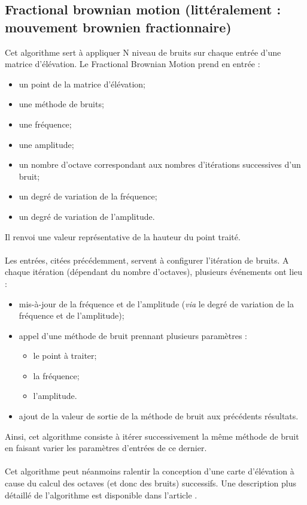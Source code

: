 \subsection{Fractional brownian motion (littéralement : mouvement brownien fractionnaire)}
Cet algorithme sert à appliquer N niveau de bruits sur chaque entrée d'une matrice d'élévation.
Le Fractional Brownian Motion prend en entrée :
\begin{itemize}
 \item un point de la matrice d'élévation;
 \item une méthode de bruits;
 \item une fréquence;
 \item une amplitude;
 \item un nombre d'octave correspondant aux nombres d'itérations successives d'un bruit;
 \item un degré de variation de la fréquence;
 \item un degré de variation de l'amplitude.
\end{itemize}
Il renvoi une valeur représentative de la hauteur du point traité.
\paragraph{}
Les entrées, citées précédemment, servent à configurer l'itération de bruits.
A chaque itération (dépendant du nombre d'octaves), plusieurs événements ont lieu :
\begin{itemize}
 \item mis-à-jour de la fréquence et de l'amplitude (\textit{via} le degré de variation de la fréquence et de l'amplitude);
 \item appel d'une méthode de bruit prennant plusieurs paramètres :
 \begin{itemize}
  \item le point à traiter;
  \item la fréquence;
  \item l'amplitude.
 \end{itemize}
 \item ajout de la valeur de sortie de la méthode de bruit aux précédents résultats.
\end{itemize}
Ainsi, cet algorithme consiste à itérer successivement la même méthode de bruit en faisant varier les paramètres d'entrées de ce dernier.
\paragraph{} 
Cet algorithme peut néanmoins ralentir la conception d'une carte d'élévation à cause du calcul des octaves (et donc des bruits) successifs.
Une description plus détaillé de l'algorithme est disponible dans l'article \cite{Mand68}.


